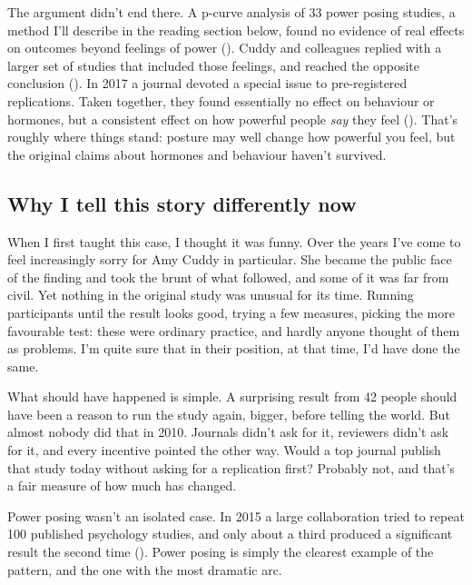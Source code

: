 \documentclass[
]{book}
\begin{document}
The argument didn't end there. A p-curve analysis of 33 power posing studies, a method I'll describe in the reading section below, found no evidence of real effects on outcomes beyond feelings of power (). Cuddy and colleagues replied with a larger set of studies that included those feelings, and reached the opposite conclusion (). In 2017 a journal devoted a special issue to pre-registered replications. Taken together, they found essentially no effect on behaviour or hormones, but a consistent effect on how powerful people \emph{say} they feel (). That's roughly where things stand: posture may well change how powerful you feel, but the original claims about hormones and behaviour haven't survived.

\subsection{Why I tell this story differently now}\label{why-i-tell-this-story-differently-now}

When I first taught this case, I thought it was funny. Over the years I've come to feel increasingly sorry for Amy Cuddy in particular. She became the public face of the finding and took the brunt of what followed, and some of it was far from civil. Yet nothing in the original study was unusual for its time. Running participants until the result looks good, trying a few measures, picking the more favourable test: these were ordinary practice, and hardly anyone thought of them as problems. I'm quite sure that in their position, at that time, I'd have done the same.

What should have happened is simple. A surprising result from 42 people should have been a reason to run the study again, bigger, before telling the world. But almost nobody did that in 2010. Journals didn't ask for it, reviewers didn't ask for it, and every incentive pointed the other way. Would a top journal publish that study today without asking for a replication first? Probably not, and that's a fair measure of how much has changed.

Power posing wasn't an isolated case. In 2015 a large collaboration tried to repeat 100 published psychology studies, and only about a third produced a significant result the second time (). Power posing is simply the clearest example of the pattern, and the one with the most dramatic arc.
\end{document}
